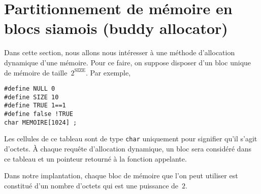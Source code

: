 \section{Partitionnement de m\'emoire en blocs siamois (buddy allocator)}
\label{sec:FrereSiamois}
Dans cette section, nous allons nous int\'eresser \`a une m\'ethode
d'allocation dynamique d'une m\'emoire.  Pour ce faire, on suppose
disposer d'un bloc unique de m\'emoire de taille~$2^{\mathrm{SIZE}}$.
Par exemple,
\begin{verbatim}
#define NULL 0
#define SIZE 10
#define TRUE 1==1
#define false !TRUE
char MEMOIRE[1024] ;
\end{verbatim}
Les cellules de ce tableau sont de type \verb+char+ uniquement pour
signifier qu'il s'agit d'octets.  \`A chaque requ\^ete d'allocation
dynamique, un bloc sera consid\'er\'e dans ce tableau et un pointeur
retourn\'e \`a la fonction appelante.

Dans notre implantation, chaque bloc de m\'emoire que l'on peut
utiliser est constitu\'e d'un nombre d'octets qui est une puissance
de~$2$.

